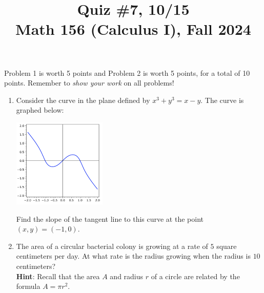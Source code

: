 \documentclass[11pt]{article}
\title{Quiz \#7, 10/15 \\ Math 156 (Calculus I), Fall 2024}
\date{}
\begin{document}
\maketitle

\thispagestyle{empty}

\vspace{-1.75cm}

Problem 1 is worth 5 points and Problem 2 is worth 5 points, for a total of 10 points. Remember to \emph{show your work} on all problems!

\begin{enumerate}
\item Consider the curve in the plane defined by $x^3 + y^3 = x - y$. The curve is graphed below:
\vspace{-0.45cm}
\begin{center}\includegraphics[width=1.75in]{quiz7.png}\end{center}
\vspace{-0.7cm}
Find the slope of the tangent line to this curve at the point $(x,y)=(-1,0)$.

\vspace{6.75cm}

\item The area of a circular bacterial colony is growing at a rate of $5$ square centimeters per day. At what rate is the radius growing when the radius is $10$ centimeters? \\{\bf Hint}: Recall that the area $A$ and radius $r$ of a circle are related by the formula $A=\pi r^2$.
\end{enumerate}
\end{document}
